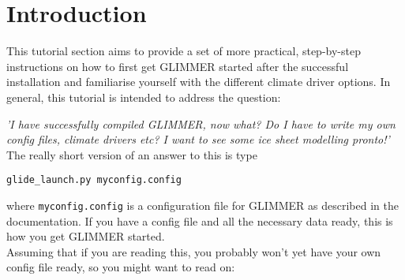 \section{Introduction}
This tutorial section aims to provide a set of more practical, step-by-step
instructions on how to first get GLIMMER started after the successful
installation and familiarise yourself with the different climate driver
options. In general, this tutorial is intended to address the question:

\emph{'I have successfully compiled GLIMMER, now what? Do I have to write my
own config files, climate drivers etc? I want to see some ice sheet modelling
pronto!'}\\

The really short version of an answer to this is type
\begin{verbatim}
glide_launch.py myconfig.config
\end{verbatim}
where \texttt{myconfig.config} is a configuration file for GLIMMER as described
in the documentation. If you have a config file and all the necessary data
ready, this is how you get GLIMMER started. \\
Assuming that if you are reading this, you probably won't yet have your own config
file ready, so you might want to read on: